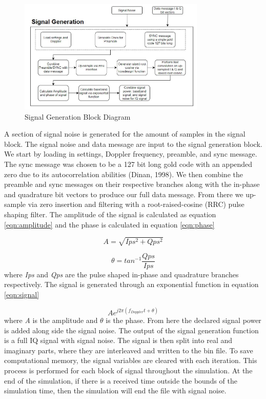 \documentclass[12pt]{report}
\begin{document}
\begin{figure}[h]
    \centering
    \includegraphics[width=3.5in]{SignalGenBlockDiagram}
    \caption{Signal Generation Block Diagram}
    \label{fig:SigGenBlock}
\end{figure}

A section of signal noise is generated for the amount of samples in the signal block. The signal noise and data message are input to the signal generation block. We start by loading in settings, Doppler frequency, preamble, and sync message. The sync message was chosen to be a 127 bit long gold code with an appended zero due to its autocorrelation abilities (Dinan, 1998).  We then combine the preamble and sync messages on their respective branches along with the in-phase and quadrature bit vectors to produce our full data message. From there we up-sample via zero insertion and filtering with a root-raised-cosine (RRC) pulse shaping filter. The amplitude of the signal is calculated as equation \ref{eqn:amplitude} and the phase is calculated in equation \ref{eqn:phase}

\begin{equation}
    A = \sqrt{Ips^2 + Qps^2}
    \label{eqn:amplitude}
\end{equation}

\begin{equation}
    \theta = tan^{-1} \frac{Qps}{Ips}
    \label{eqn:phase}
\end{equation}
where \textit{Ips} and \textit{Qps} are the pulse shaped in-phase and quadrature branches respectively. The signal is generated through an exponential function in equation \ref{eqn:signal}

\begin{equation}
    A e^{j2\pi (f_{Doppler}t + \theta)}
    \label{eqn:signal}
\end{equation}
where \textit{A} is the amplitude and $\theta$ is the phase. From here the declared signal power is added along side the signal noise. The output of the signal generation function is a full IQ signal with signal noise. The signal is then split into real and imaginary parts, where they are interleaved and written to the bin file. To save computational memory, the signal variables are cleared with each iteration. This process is performed for each block of signal throughout the simulation. At the end of the simulation, if there is a received time outside the bounds of the simulation time, then the simulation will end the file with signal noise.
\end{document}
